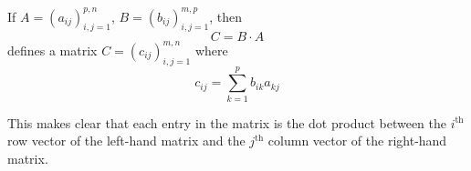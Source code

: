 \documentclass[../linear-spaces.tex]{subfiles}
\begin{document}
\begin{definition}
    If $A = \left(a_{ij}\right)^{p,n}_{i,j=1}$, $B = \left(b_{ij}\right)^{m,p}_{i,j=1}$, then
    \begin{equation*}
        C = B\cdot A
    \end{equation*}
    defines a matrix $C = \left(c_{ij}\right)^{m,n}_{i,j=1}$ where
    \begin{equation*}
        c_{ij} = \sum_{k=1}^{p} {b_{ik} a_{kj}}
    \end{equation*}
\end{definition}

This makes clear that each entry in the matrix is the dot product between the
$i^{\text{th}}$ row vector of the left-hand matrix and the $j^{\text{th}}$
column vector of the right-hand matrix. 
\pagebreak
\end{document}
